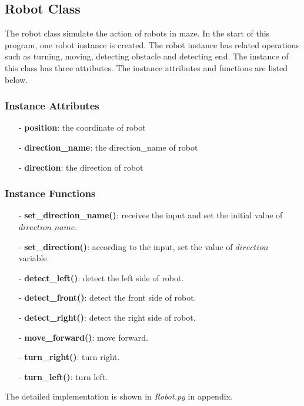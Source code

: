\documentclass[11pt,times,oneside,openright,hardcopy]{eeereport}
\begin{document}
\subsection{Robot Class}
The robot class simulate the action of robots in maze.
In the start of this program, one robot instance is created. 
The robot instance has related operations such as turning, moving, detecting obstacle and detecting end.
The instance of this class has three attributes. The instance attributes and functions are listed below.
\subsubsection{Instance Attributes}
\begin{itemize}
    \item[-] \textbf{position}: the coordinate of robot
    \item[-] \textbf{direction\_name}: the direction\_name of robot
    \item[-] \textbf{direction}: the direction of robot
\end{itemize}
\subsubsection{Instance Functions}
\begin{itemize}
    \item[-] \textbf{set\_direction\_name()}: \newline receives the input and set the initial value of $direction\_name$.
    \item[-] \textbf{set\_direction()}: \newline according to the input, set the value of $direction$ variable.
    \item[-] \textbf{detect\_left()}: \newline detect the left side of robot.
    \item[-] \textbf{detect\_front()}: \newline detect the front side of robot.
    \item[-] \textbf{detect\_right()}: \newline detect the right side of robot.
    \item[-] \textbf{move\_forward()}: \newline move forward.
    \item[-] \textbf{turn\_right()}: \newline turn right.
    \item[-] \textbf{turn\_left()}: \newline turn left.
\end{itemize}
The detailed implementation is shown in \textit{Robot.py} in appendix.
\end{document}

